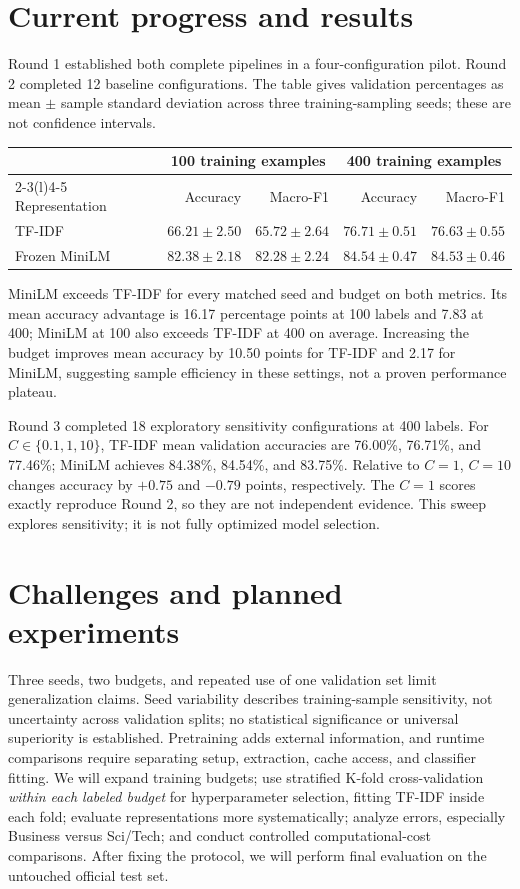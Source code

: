 \documentclass[10pt,letterpaper]{article}
\begin{document}
\section{Current progress and results}
Round 1 established both complete pipelines in a four-configuration pilot. Round 2 completed 12 baseline configurations. The table gives validation percentages as mean $\pm$ sample standard deviation across three training-sampling seeds; these are not confidence intervals.
\vspace{-2pt}
\begin{center}
\small
\begin{tabular}{@{}lrrrr@{}}
\toprule
& \multicolumn{2}{c}{100 training examples} & \multicolumn{2}{c}{400 training examples}\\
\cmidrule(lr){2-3}\cmidrule(l){4-5}
Representation & Accuracy & Macro-F1 & Accuracy & Macro-F1\\
\midrule
TF-IDF & $66.21\pm2.50$ & $65.72\pm2.64$ & $76.71\pm0.51$ & $76.63\pm0.55$\\
Frozen MiniLM & $82.38\pm2.18$ & $82.28\pm2.24$ & $84.54\pm0.47$ & $84.53\pm0.46$\\
\bottomrule
\end{tabular}
\end{center}
\vspace{-5pt}
MiniLM exceeds TF-IDF for every matched seed and budget on both metrics. Its mean accuracy advantage is 16.17 percentage points at 100 labels and 7.83 at 400; MiniLM at 100 also exceeds TF-IDF at 400 on average. Increasing the budget improves mean accuracy by 10.50 points for TF-IDF and 2.17 for MiniLM, suggesting sample efficiency in these settings, not a proven performance plateau.

Round 3 completed 18 exploratory sensitivity configurations at 400 labels. For $C\in\{0.1,1,10\}$, TF-IDF mean validation accuracies are 76.00\%, 76.71\%, and 77.46\%; MiniLM achieves 84.38\%, 84.54\%, and 83.75\%. Relative to $C=1$, $C=10$ changes accuracy by $+0.75$ and $-0.79$ points, respectively. The $C=1$ scores exactly reproduce Round 2, so they are not independent evidence. This sweep explores sensitivity; it is not fully optimized model selection.

\section{Challenges and planned experiments}
Three seeds, two budgets, and repeated use of one validation set limit generalization claims. Seed variability describes training-sample sensitivity, not uncertainty across validation splits; no statistical significance or universal superiority is established. Pretraining adds external information, and runtime comparisons require separating setup, extraction, cache access, and classifier fitting. We will expand training budgets; use stratified K-fold cross-validation \emph{within each labeled budget} for hyperparameter selection, fitting TF-IDF inside each fold; evaluate representations more systematically; analyze errors, especially Business versus Sci/Tech; and conduct controlled computational-cost comparisons. After fixing the protocol, we will perform final evaluation on the untouched official test set.
\end{document}
